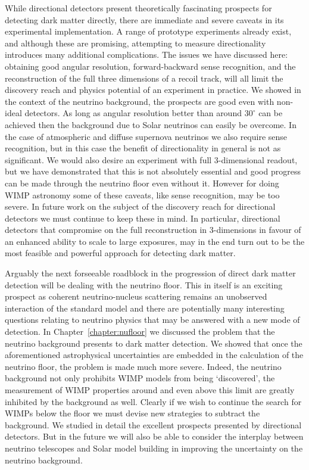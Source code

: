 While directional detectors present theoretically fascinating prospects for detecting dark matter directly, there are immediate and severe caveats in its experimental implementation. A range of prototype experiments already exist, and although these are promising, attempting to measure directionality introduces many additional complications. The issues we have discussed here: obtaining good angular resolution, forward-backward sense recognition, and the reconstruction of the full three dimensions of a recoil track, will all limit the discovery reach and physics potential of an experiment in practice. We showed in the context of the neutrino background, the prospects are good even with non-ideal detectors. As long as angular resolution better than around $30^\circ$ can be achieved then the background due to Solar neutrinos can easily be overcome. In the case of atmospheric and diffuse supernova neutrinos we also require sense recognition, but in this case the benefit of directionality in general is not as significant. We would also desire an experiment with full 3-dimensional readout, but we have demonstrated that this is not absolutely essential and good progress can be made through the neutrino floor even without it. However for doing WIMP astronomy some of these caveats, like sense recognition, may be too severe. In future work on the subject of the discovery reach for directional detectors we must continue to keep these in mind. In particular, directional detectors that compromise on the full reconstruction in 3-dimensions in favour of an enhanced ability to scale to large exposures, may in the end turn out to be the most feasible and powerful approach for detecting dark matter. 

Arguably the next forseeable roadblock in the progression of direct dark matter detection will be dealing with the neutrino floor. This in itself is an exciting prospect as coherent neutrino-nucleus scattering remains an unobserved interaction of the standard model and there are potentially many interesting questions relating to neutrino physics that may be answered with a new mode of detection. In Chapter~\ref{chapter:nufloor} we discussed the problem that the neutrino background presents to dark matter detection. We showed that once the aforementioned astrophysical uncertainties are embedded in the calculation of the neutrino floor, the problem is made much more severe. Indeed, the neutrino background not only prohibits WIMP models from being `discovered', the measurement of WIMP properties around and even above this limit are greatly inhibited by the background as well. Clearly if we wish to continue the search for WIMPs below the floor we must devise new strategies to subtract the background. We studied in detail the excellent prospects presented by directional detectors. But in the future we will also be able to consider the interplay between neutrino telescopes and Solar model building in improving the uncertainty on the neutrino background. 

